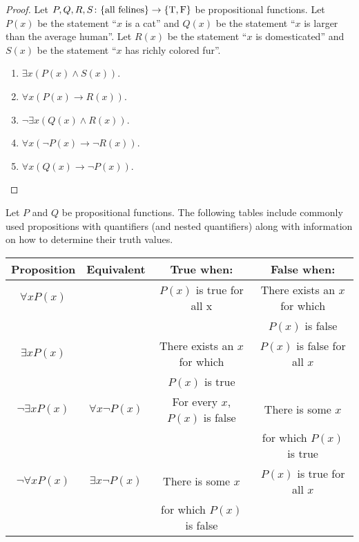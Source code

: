 \documentclass[../notes.tex]{subfiles}
\begin{document}
\begin{proof} 
    Let $P, Q, R, S\colon \{\text{all felines}\} \rightarrow \{\text T, \text F \}$ be propositional functions. Let $P(x)$ be the statement ``$x$ is a cat'' and $Q(x)$ be the statement ``$x$ is larger than the average human''. Let $R(x)$ be the statement ``$x$ is domesticated'' and $S(x)$ be the statement ``$x$ has richly colored fur''.
    \begin{enumerate}[label=(\alph*)]
        \item $\exists x (P(x) \land S(x)) $.
        \item $\forall x (P(x) \rightarrow R(x))$.
        \item $\neg \exists x (Q(x) \land R(x))$.
        \item $\forall x(\neg P(x) \rightarrow \neg R(x))$.
        \item $\forall x(Q(x) \rightarrow \neg P(x))$.
        \qedhere
    \end{enumerate}
\end{proof}
Let $P$ and $Q$ be propositional functions. The following tables include commonly used propositions with quantifiers (and nested quantifiers) along with information on how to determine their truth values.
\begin{center}
    \begin{tabular}{c|c|c|c}
        Proposition & Equivalent & True when: & False when: \\
        \hline
        $\forall x P(x)$ && $P(x)$ is true for all x & There exists an $x$ for which\\
        &&& $P(x)$ is false \\
        \hline
        $\exists x P(x)$ && There exists an $x$ for which & $P(x)$ is false for all $x$ \\
        && $P(x)$ is true & \\
        \hline
        $\neg \exists x P(x)$ & $\forall x \neg P(x)$ & For every $x$, $P(x)$ is false & There is some $x$ \\
        & & & for which $P(x)$ is true  \\  
        \hline
        $\neg \forall x P(x)$ & $\exists x \neg P(x)$ & There is some $x$ & $P(x)$ is true for all $x$ \\
         & & for which $P(x)$ is false &
    \end{tabular}
\end{center}
\end{document}
